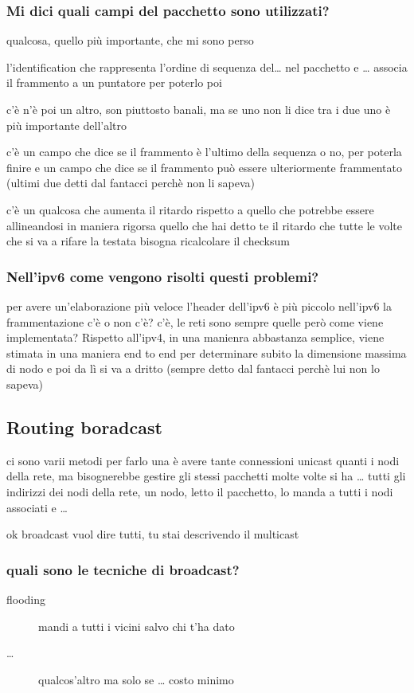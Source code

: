 \documentclass[11pt]{article}
\begin{document}
\subsubsection{Mi dici quali campi del pacchetto sono utilizzati?}
\label{sec:orgdb14066}
qualcosa, quello più importante, che mi sono perso

l'identification che rappresenta l'ordine di sequenza del\ldots{} nel pacchetto e \ldots{}
associa il frammento a un puntatore per poterlo poi

c'è n'è poi un altro, son piuttosto banali, ma se uno non li dice
tra i due uno è più importante dell'altro

c'è un campo che dice se il frammento è l'ultimo della sequenza o no, per poterla finire
e un campo che dice se il frammento può essere ulteriormente frammentato
(ultimi due detti dal fantacci perchè non li sapeva)

c'è un qualcosa che aumenta il ritardo rispetto a quello che potrebbe essere allineandosi in maniera rigorsa quello che hai detto te
il ritardo che tutte le volte che si va a rifare la testata bisogna ricalcolare il checksum

\subsubsection{Nell'ipv6 come vengono risolti questi problemi?}
\label{sec:orgfecf157}
per avere un'elaborazione più veloce l'header dell'ipv6 è più piccolo
nell'ipv6 la frammentazione c'è o non c'è? c'è, le reti sono sempre quelle
però come viene implementata? Rispetto all'ipv4, in una manienra abbastanza semplice, viene stimata in una maniera end to end per determinare subito la dimensione massima di nodo e poi da lì si va a dritto
(sempre detto dal fantacci perchè lui non lo sapeva)

\subsection{Routing boradcast}
\label{sec:org0b8cda1}
ci sono varii metodi per farlo
una è avere tante connessioni unicast quanti i nodi della rete, ma bisognerebbe gestire gli stessi pacchetti molte volte
si ha \ldots{} tutti gli indirizzi dei nodi della rete, un nodo, letto il pacchetto, lo manda a tutti i nodi associati e \ldots{}

ok broadcast vuol dire tutti, tu stai descrivendo il multicast

\subsubsection{quali sono le tecniche di broadcast?}
\label{sec:orgbd167d3}
\begin{description}
\item[{flooding}] mandi a tutti i vicini salvo chi t'ha dato
\item[{\ldots{}}] qualcos'altro ma solo se \ldots{} costo minimo
\end{description}
\end{document}
